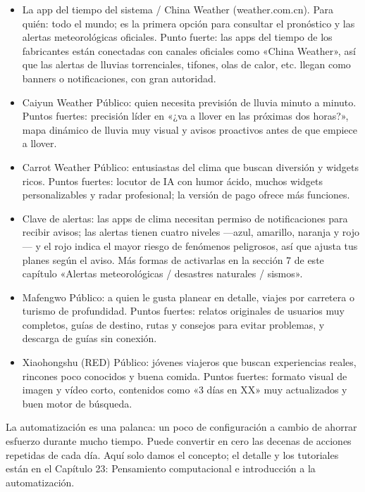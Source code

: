 \begin{itemize}
  \item La app del tiempo del sistema / China Weather (weather.com.cn). Para quién: todo el mundo; es la primera opción para consultar el pronóstico y las alertas meteorológicas oficiales. Punto fuerte: las apps del tiempo de los fabricantes están conectadas con canales oficiales como «China Weather», así que las alertas de lluvias torrenciales, tifones, olas de calor, etc. llegan como banners o notificaciones, con gran autoridad.
  \item Caiyun Weather Público: quien necesita previsión de lluvia minuto a minuto. Puntos fuertes: precisión líder en «¿va a llover en las próximas dos horas?», mapa dinámico de lluvia muy visual y avisos proactivos antes de que empiece a llover.
  \item Carrot Weather Público: entusiastas del clima que buscan diversión y widgets ricos. Puntos fuertes: locutor de IA con humor ácido, muchos widgets personalizables y radar profesional; la versión de pago ofrece más funciones.
  \item Clave de alertas: las apps de clima necesitan permiso de notificaciones para recibir avisos; las alertas tienen cuatro niveles —azul, amarillo, naranja y rojo— y el rojo indica el mayor riesgo de fenómenos peligrosos, así que ajusta tus planes según el aviso. Más formas de activarlas en la sección 7 de este capítulo «Alertas meteorológicas / desastres naturales / sismos».
\end{itemize}


\begin{itemize}
  \item Mafengwo Público: a quien le gusta planear en detalle, viajes por carretera o turismo de profundidad. Puntos fuertes: relatos originales de usuarios muy completos, guías de destino, rutas y consejos para evitar problemas, y descarga de guías sin conexión.
  \item Xiaohongshu (RED) Público: jóvenes viajeros que buscan experiencias reales, rincones poco conocidos y buena comida. Puntos fuertes: formato visual de imagen y vídeo corto, contenidos como «3 días en XX» muy actualizados y buen motor de búsqueda.
\end{itemize}


La automatización es una palanca: un poco de configuración a cambio de ahorrar esfuerzo durante mucho tiempo. Puede convertir en cero las decenas de acciones repetidas de cada día. Aquí solo damos el concepto; el detalle y los tutoriales están en el Capítulo 23: Pensamiento computacional e introducción a la automatización.

